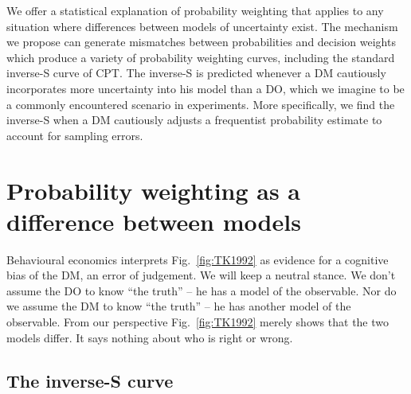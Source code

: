 \documentclass[a4paper, 12pt]{article}
\newcommand{\fref}[1]{Fig.~\ref{fig:#1}}
\newcommand{\seclabel}[1]{\label{sec:#1}}
\newcommand{\MK}[1]{\textcolor{red}{\textit{***MK: #1 MK***}}}
\begin{document}
We offer a statistical explanation of probability weighting that applies to any situation where differences between models of uncertainty exist. The mechanism we propose can generate mismatches between probabilities and decision weights which produce a variety of probability weighting curves, including the standard inverse-S curve of CPT. The inverse-S is predicted whenever a DM cautiously incorporates more uncertainty into his model than a DO, which we imagine to be a commonly encountered scenario in experiments. More specifically, we find the inverse-S when a DM cautiously adjusts a frequentist probability estimate to account for sampling errors.
%
% 
%



\section{Probability weighting as a difference between models} \seclabel{ModelDiff}
Behavioural economics interprets \fref{TK1992} as evidence for a cognitive bias of the DM, an error of judgement. We will keep a neutral stance. We don't assume the DO to know ``the truth'' -- he has a model of the observable. Nor do we assume the DM to know ``the truth'' -- he has another model of the observable. From our perspective \fref{TK1992} merely shows that the two models differ. It says nothing about who is right or wrong.

\subsection{The inverse-S curve\seclabel{The_inverse}}
\end{document}
